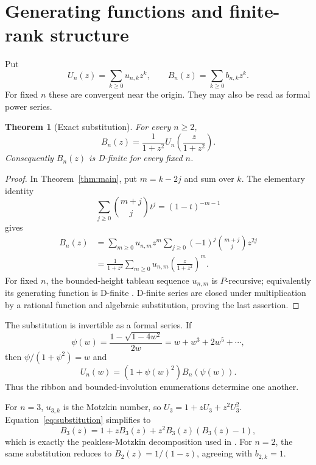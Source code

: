 \documentclass[11pt]{article}
\newtheorem{theorem}{Theorem}[section]
\theoremstyle{definition}
\begin{document}
\section{Generating functions and finite-rank structure}

Put
\[
 U_n(z)=\sum_{k\ge0}u_{n,k}z^k,
 \qquad B_n(z)=\sum_{k\ge0}b_{n,k}z^k.
\]
For fixed $n$ these are convergent near the origin.  They may also be read as
formal power series.

\begin{theorem}[Exact substitution]\label{thm:substitution}
For every $n\ge2$,
\begin{equation}\label{eq:substitution}
 B_n(z)=\frac{1}{1+z^2}
 U_n\!\left(\frac{z}{1+z^2}\right).
\end{equation}
Consequently $B_n(z)$ is D-finite for every fixed $n$.
\end{theorem}

\begin{proof}
In Theorem~\ref{thm:main}, put $m=k-2j$ and sum over $k$.  The elementary
identity
\[
 \sum_{j\ge0}\binom{m+j}{j}t^j=(1-t)^{-m-1}
\]
gives
\begin{align*}
 B_n(z)
 &=\sum_{m\ge0}u_{n,m}z^m
   \sum_{j\ge0}(-1)^j\binom{m+j}{j}z^{2j}\\
 &=\frac{1}{1+z^2}
   \sum_{m\ge0}u_{n,m}
   \left(\frac{z}{1+z^2}\right)^m.
\end{align*}
For fixed $n$, the bounded-height tableau sequence $u_{n,m}$ is
$P$-recursive; equivalently its generating function is D-finite
\cite{BergeronGascon2000}.  D-finite series are closed under multiplication by a
rational function and algebraic substitution, proving the last assertion.
\end{proof}

The substitution is invertible as a formal series.  If
\[
 \psi(w)=\frac{1-\sqrt{1-4w^2}}{2w}=w+w^3+2w^5+\cdots,
\]
then $\psi/(1+\psi^2)=w$ and
\begin{equation}\label{eq:inverse-substitution}
 U_n(w)=(1+\psi(w)^2)B_n(\psi(w)).
\end{equation}
Thus the ribbon and bounded-involution enumerations determine one another.

For $n=3$, $u_{3,k}$ is the Motzkin number, so
$U_3=1+zU_3+z^2U_3^2$.  Equation~\eqref{eq:substitution} simplifies to
\[
 B_3(z)=1+zB_3(z)+z^2B_3(z)(B_3(z)-1),
\]
which is exactly the peakless-Motzkin decomposition used in
\cite{Tenn2026}.  For $n=2$, the same substitution reduces to
$B_2(z)=1/(1-z)$, agreeing with $b_{2,k}=1$.
\end{document}
